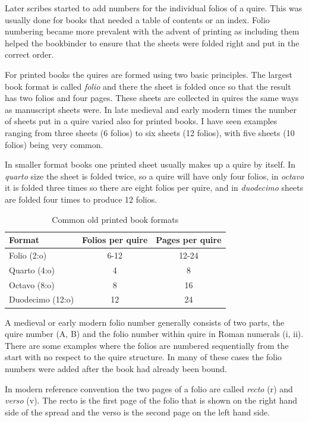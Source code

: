 \documentclass[a4paper, 12pt]{article}
\begin{document}
Later scribes started to add numbers for the individual folios of a
quire. This was usually done for books that needed a table of contents
or an index. Folio numbering became more prevalent with the advent of
printing as including them helped the bookbinder to ensure that the
sheets were folded right and put in the correct order.

For printed books the quires are formed using two basic principles.
The largest book format is called \emph{folio} and there the sheet is
folded once so that the result has two folios and four pages. These
sheets are collected in quires the same ways as manuscript sheets
were. In late medieval and early modern times the number of sheets put
in a quire varied also for printed books. I have seen examples ranging
from three sheets (6 folios) to six sheets (12 folios), with five
sheets (10 folios) being very common.

In smaller format books one printed sheet usually makes up a quire by
itself. In \emph{quarto} size the sheet is folded twice, so a quire
will have only four folios, in \emph{octavo} it is folded three times
so there are eight folios per quire, and in \emph{duodecimo} sheets
are folded four times to produce 12 folios.

\begin{table}[b]
  \centering
  \begin{tabular}{lcc}
    Format & Folios per quire & Pages per quire \\
    \hline
    Folio (2:o) &  6-12 & 12-24 \\ 
    Quarto (4:o) & 4 & 8 \\
    Octavo (8:o) & 8 & 16 \\
    Duodecimo (12:o) & 12 & 24 \\
  \end{tabular}
  \caption{Common old printed book formats}
  \label{fig:formats}
\end{table}

A medieval or early modern folio number generally consists of two
parts, the quire number (A, B) and the folio number within quire in
Roman numerals (i, ii). There are some examples where the folios are
numbered sequentially from the start with no respect to the quire
structure. In many of these cases the folio numbers were added after
the book had already been bound.

In modern reference convention the
two pages of a folio are called \emph{recto} (r) and \emph{verso} (v).
The recto is the first page of the folio that is shown on the right
hand side of the spread and the verso is the second page on the left
hand side.
\end{document}
